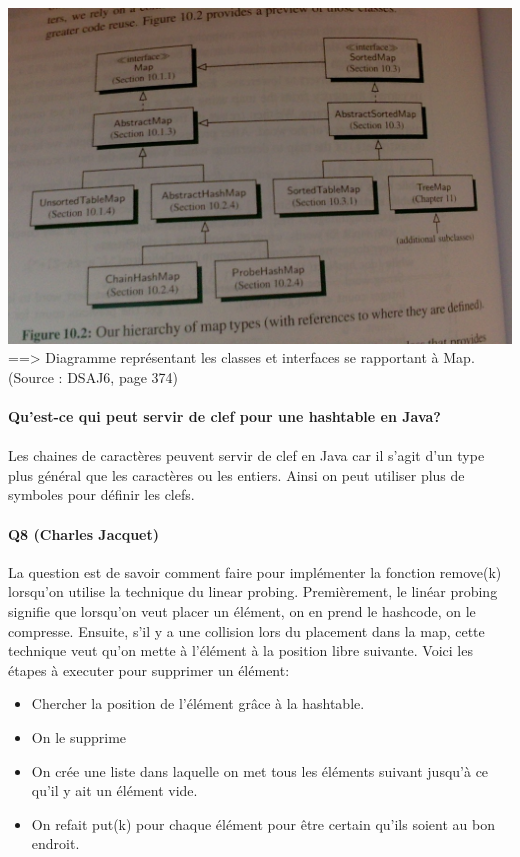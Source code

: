 \documentclass[a4paper]{article}
\begin{document}
\includegraphics[scale=0.3]{diagramme.png}
\\
==> Diagramme représentant les classes et interfaces se rapportant à Map. \\
(Source : DSAJ6, page 374)\\

\paragraph{Qu'est-ce qui peut servir de clef pour une hashtable en Java?}
\paragraph*{}
Les chaines de caractères peuvent servir de clef en Java car il s'agit d'un type plus général que les caractères ou les entiers. Ainsi on peut utiliser plus de symboles pour définir les clefs. 

\paragraph{Q8 (Charles Jacquet)}
La question est de savoir comment faire pour implémenter la fonction remove(k) lorsqu'on utilise la technique du linear probing. Premièrement, le linéar probing signifie que lorsqu'on veut placer un élément, on en prend le hashcode, on le compresse. Ensuite, s'il y a une collision lors du placement dans la map, cette technique veut qu'on mette à l'élément à la position libre suivante. Voici les étapes à executer pour supprimer un élément:
\begin{itemize}
\item Chercher la position de l'élément grâce à la hashtable.
\item On le supprime
\item On crée une liste dans laquelle on met tous les éléments suivant jusqu'à ce qu'il y ait un élément vide.
\item On refait put(k) pour chaque élément pour être certain qu'ils soient au bon endroit.
\end{itemize}
\end{document}
